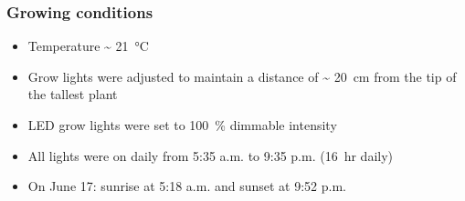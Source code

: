 \documentclass[
    12pt,
    aspectratio=1610,
    bibliography=../bibliography.bib,
    link-citations]{beamer}
\begin{document}
    \begin{frame}
        \frametitle{Growing conditions}
        \begin{itemize}
            \item Temperature \~{} \qty[mode=text]{21}{\degreeCelsius}
            \item Grow lights were adjusted to maintain a distance of \~{} \qty[mode=text]{20}{\cm} from the tip of the tallest plant
            \item LED grow lights were set to \qty[mode=text]{100}{\percent} dimmable intensity
            \item All lights were on daily from 5:35 a.m. to 9:35 p.m. (\qty[mode=text]{16}{hr} daily)
            \item On June 17: sunrise at 5:18 a.m. and sunset at 9:52 p.m.
        \end{itemize}
    \end{frame}
\end{document}
